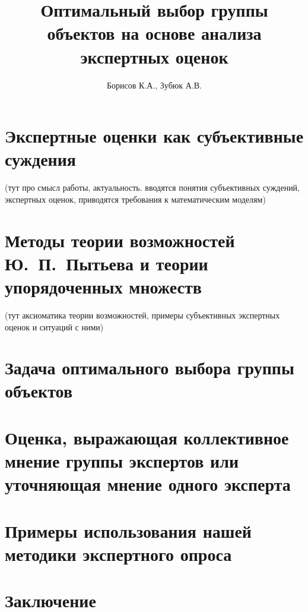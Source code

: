 \documentclass{article}
\begin{document}

\thispagestyle{empty}			

\title{Оптимальный выбор группы объектов на основе анализа экспертных оценок} 
\author{Борисов К.А., Зубюк А.В.}
\maketitle

\tableofcontents
\newpage

\section{Экспертные оценки как субъективные суждения} 
(тут про смысл работы, актуальность. вводятся понятия субъективных суждений, экспертных оценок, приводятся требования к математическим моделям)
% 

\section{Методы теории возможностей Ю.~П.~Пытьева и теории упорядоченных  множеств}
(тут аксиоматика теории возможностей, примеры субъективных экспертных оценок и ситуаций с ними)
% 

\section{Задача оптимального выбора группы объектов}


\section{Оценка, выражающая коллективное мнение группы экспертов или уточняющая мнение одного эксперта}
% 

\section{Примеры использования нашей методики экспертного опроса}


\section{Заключение}
% 

\end{document}
